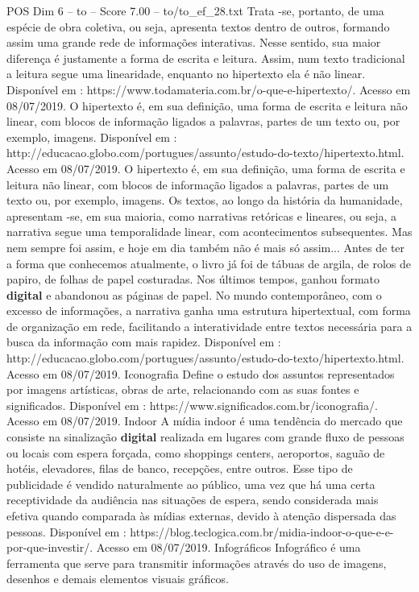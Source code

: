 \begin{textsample}{POS Dim 6 – to – Score 7.00 – to/to\_ef\_28.txt}
Trata -se, portanto, de uma espécie de obra coletiva, ou seja, apresenta textos dentro de outros, formando assim uma grande rede de informações interativas.
Nesse sentido, sua maior diferença é justamente a forma de escrita e leitura.
Assim, num texto tradicional a leitura segue uma linearidade, enquanto no hipertexto ela é não linear.
Disponível em : https://www.todamateria.com.br/o-que-e-hipertexto/.
Acesso em 08/07/2019.
O hipertexto é, em sua definição, uma forma de escrita e leitura não linear, com blocos de informação ligados a palavras, partes de um texto ou, por exemplo, imagens.
Disponível em : http://educacao.globo.com/portugues/assunto/estudo-do-texto/hipertexto.html.
Acesso em 08/07/2019.
O hipertexto é, em sua definição, uma forma de escrita e leitura não linear, com blocos de informação ligados a palavras, partes de um texto ou, por exemplo, imagens.
Os textos, ao longo da história da humanidade, apresentam -se, em sua maioria, como narrativas retóricas e lineares, ou seja, a narrativa segue uma temporalidade linear, com acontecimentos subsequentes.
Mas nem sempre foi assim, e hoje em dia também não é mais só assim...
Antes de ter a forma que conhecemos atualmente, o livro já foi de tábuas de argila, de rolos de papiro, de folhas de papel costuradas.
Nos últimos tempos, ganhou formato \textbf{digital} e abandonou as páginas de papel.
No mundo contemporâneo, com o excesso de informações, a narrativa ganha uma estrutura hipertextual, com forma de organização em rede, facilitando a interatividade entre textos necessária para a busca da informação com mais rapidez.
Disponível em : http://educacao.globo.com/portugues/assunto/estudo-do-texto/hipertexto.html.
Acesso em 08/07/2019.
Iconografia Define o estudo dos assuntos representados por imagens artísticas, obras de arte, relacionando com as suas fontes e significados.
Disponível em : https://www.significados.com.br/iconografia/.
Acesso em 08/07/2019.
Indoor A mídia indoor é uma tendência do mercado que consiste na sinalização \textbf{digital} realizada em lugares com grande fluxo de pessoas ou locais com espera forçada, como shoppings centers, aeroportos, saguão de hotéis, elevadores, filas de banco, recepções, entre outros.
Esse tipo de publicidade é vendido naturalmente ao público, uma vez que há uma certa receptividade da audiência nas situações de espera, sendo considerada mais efetiva quando comparada às mídias externas, devido à atenção dispersada das pessoas.
Disponível em : https://blog.teclogica.com.br/midia-indoor-o-que-e-e-por-que-investir/.
Acesso em 08/07/2019.
Infográficos Infográfico é uma ferramenta que serve para transmitir informações através do uso de imagens, desenhos e demais elementos visuais gráficos.

\end{textsample}
